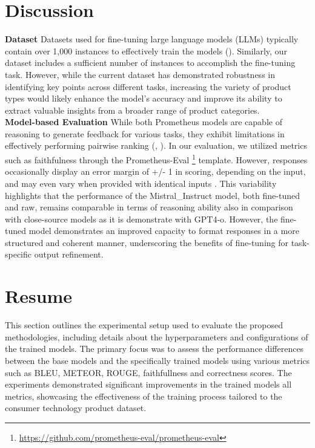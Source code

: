 \section{Discussion}
\textbf{Dataset} Datasets used for fine-tuning large language models (LLMs) typically contain over 1,000 instances to effectively train the models (\cite{liu2024datasetslargelanguagemodels}). Similarly, our dataset includes a sufficient number of instances to accomplish the fine-tuning task. However, while the current dataset has demonstrated robustness in identifying key points across different tasks, increasing the variety of product types would likely enhance the model's accuracy and improve its ability to extract valuable insights from a broader range of product categories.\\
\textbf{Model-based Evaluation} While both Prometheus models are capable of reasoning to generate feedback for various tasks, they exhibit limitations in effectively performing pairwise ranking (\cite{kim2024prometheusinducingfinegrainedevaluation}, \cite{kim2024prometheus2opensource}). In our evaluation, we utilized metrics such as faithfulness through the Prometheus-Eval \footnote{\url{https://github.com/prometheus-eval/prometheus-eval}} template. However, responses occasionally display an error margin of +/- 1 in scoring, depending on the input, and may even vary when provided with identical inputs \cite{kim2024biggenbenchprincipledbenchmark}.  This variability highlights that the performance of the Mistral\_Instruct model, both fine-tuned and raw, remains comparable in terms of reasoning ability also in comparison with close-source models as it is demonstrate with GPT4-o. However, the fine-tuned model demonstrates an improved capacity to format responses in a more structured and coherent manner, underscoring the benefits of fine-tuning for task-specific output refinement.

\section{Resume}
This section outlines the experimental setup used to evaluate the proposed methodologies, including details about the hyperparameters and configurations of the trained models. The primary focus was to assess the performance differences between the base models and the specifically trained models using various metrics such as BLEU, METEOR, ROUGE, faithfullness and correctness scores. The experiments demonstrated significant improvements in the trained models all metrics, showcasing the effectiveness of the training process tailored to the consumer technology product dataset.